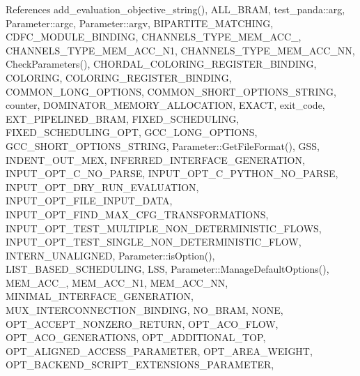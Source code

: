 References add\+\_\+evaluation\+\_\+objective\+\_\+string(), A\+L\+L\+\_\+\+B\+R\+AM, test\+\_\+panda\+::arg, Parameter\+::argc, Parameter\+::argv, B\+I\+P\+A\+R\+T\+I\+T\+E\+\_\+\+M\+A\+T\+C\+H\+I\+NG, C\+D\+F\+C\+\_\+\+M\+O\+D\+U\+L\+E\+\_\+\+B\+I\+N\+D\+I\+NG, C\+H\+A\+N\+N\+E\+L\+S\+\_\+\+T\+Y\+P\+E\+\_\+\+M\+E\+M\+\_\+\+A\+C\+C\+\_, C\+H\+A\+N\+N\+E\+L\+S\+\_\+\+T\+Y\+P\+E\+\_\+\+M\+E\+M\+\_\+\+A\+C\+C\+\_\+\+N1, C\+H\+A\+N\+N\+E\+L\+S\+\_\+\+T\+Y\+P\+E\+\_\+\+M\+E\+M\+\_\+\+A\+C\+C\+\_\+\+NN, Check\+Parameters(), C\+H\+O\+R\+D\+A\+L\+\_\+\+C\+O\+L\+O\+R\+I\+N\+G\+\_\+\+R\+E\+G\+I\+S\+T\+E\+R\+\_\+\+B\+I\+N\+D\+I\+NG, C\+O\+L\+O\+R\+I\+NG, C\+O\+L\+O\+R\+I\+N\+G\+\_\+\+R\+E\+G\+I\+S\+T\+E\+R\+\_\+\+B\+I\+N\+D\+I\+NG, C\+O\+M\+M\+O\+N\+\_\+\+L\+O\+N\+G\+\_\+\+O\+P\+T\+I\+O\+NS, C\+O\+M\+M\+O\+N\+\_\+\+S\+H\+O\+R\+T\+\_\+\+O\+P\+T\+I\+O\+N\+S\+\_\+\+S\+T\+R\+I\+NG, counter, D\+O\+M\+I\+N\+A\+T\+O\+R\+\_\+\+M\+E\+M\+O\+R\+Y\+\_\+\+A\+L\+L\+O\+C\+A\+T\+I\+ON, E\+X\+A\+CT, exit\+\_\+code, E\+X\+T\+\_\+\+P\+I\+P\+E\+L\+I\+N\+E\+D\+\_\+\+B\+R\+AM, F\+I\+X\+E\+D\+\_\+\+S\+C\+H\+E\+D\+U\+L\+I\+NG, F\+I\+X\+E\+D\+\_\+\+S\+C\+H\+E\+D\+U\+L\+I\+N\+G\+\_\+\+O\+PT, G\+C\+C\+\_\+\+L\+O\+N\+G\+\_\+\+O\+P\+T\+I\+O\+NS, G\+C\+C\+\_\+\+S\+H\+O\+R\+T\+\_\+\+O\+P\+T\+I\+O\+N\+S\+\_\+\+S\+T\+R\+I\+NG, Parameter\+::\+Get\+File\+Format(), G\+SS, I\+N\+D\+E\+N\+T\+\_\+\+O\+U\+T\+\_\+\+M\+EX, I\+N\+F\+E\+R\+R\+E\+D\+\_\+\+I\+N\+T\+E\+R\+F\+A\+C\+E\+\_\+\+G\+E\+N\+E\+R\+A\+T\+I\+ON, I\+N\+P\+U\+T\+\_\+\+O\+P\+T\+\_\+\+C\+\_\+\+N\+O\+\_\+\+P\+A\+R\+SE, I\+N\+P\+U\+T\+\_\+\+O\+P\+T\+\_\+\+C\+\_\+\+P\+Y\+T\+H\+O\+N\+\_\+\+N\+O\+\_\+\+P\+A\+R\+SE, I\+N\+P\+U\+T\+\_\+\+O\+P\+T\+\_\+\+D\+R\+Y\+\_\+\+R\+U\+N\+\_\+\+E\+V\+A\+L\+U\+A\+T\+I\+ON, I\+N\+P\+U\+T\+\_\+\+O\+P\+T\+\_\+\+F\+I\+L\+E\+\_\+\+I\+N\+P\+U\+T\+\_\+\+D\+A\+TA, I\+N\+P\+U\+T\+\_\+\+O\+P\+T\+\_\+\+F\+I\+N\+D\+\_\+\+M\+A\+X\+\_\+\+C\+F\+G\+\_\+\+T\+R\+A\+N\+S\+F\+O\+R\+M\+A\+T\+I\+O\+NS, I\+N\+P\+U\+T\+\_\+\+O\+P\+T\+\_\+\+T\+E\+S\+T\+\_\+\+M\+U\+L\+T\+I\+P\+L\+E\+\_\+\+N\+O\+N\+\_\+\+D\+E\+T\+E\+R\+M\+I\+N\+I\+S\+T\+I\+C\+\_\+\+F\+L\+O\+WS, I\+N\+P\+U\+T\+\_\+\+O\+P\+T\+\_\+\+T\+E\+S\+T\+\_\+\+S\+I\+N\+G\+L\+E\+\_\+\+N\+O\+N\+\_\+\+D\+E\+T\+E\+R\+M\+I\+N\+I\+S\+T\+I\+C\+\_\+\+F\+L\+OW, I\+N\+T\+E\+R\+N\+\_\+\+U\+N\+A\+L\+I\+G\+N\+ED, Parameter\+::is\+Option(), L\+I\+S\+T\+\_\+\+B\+A\+S\+E\+D\+\_\+\+S\+C\+H\+E\+D\+U\+L\+I\+NG, L\+SS, Parameter\+::\+Manage\+Default\+Options(), M\+E\+M\+\_\+\+A\+C\+C\+\_, M\+E\+M\+\_\+\+A\+C\+C\+\_\+\+N1, M\+E\+M\+\_\+\+A\+C\+C\+\_\+\+NN, M\+I\+N\+I\+M\+A\+L\+\_\+\+I\+N\+T\+E\+R\+F\+A\+C\+E\+\_\+\+G\+E\+N\+E\+R\+A\+T\+I\+ON, M\+U\+X\+\_\+\+I\+N\+T\+E\+R\+C\+O\+N\+N\+E\+C\+T\+I\+O\+N\+\_\+\+B\+I\+N\+D\+I\+NG, N\+O\+\_\+\+B\+R\+AM, N\+O\+NE, O\+P\+T\+\_\+\+A\+C\+C\+E\+P\+T\+\_\+\+N\+O\+N\+Z\+E\+R\+O\+\_\+\+R\+E\+T\+U\+RN, O\+P\+T\+\_\+\+A\+C\+O\+\_\+\+F\+L\+OW, O\+P\+T\+\_\+\+A\+C\+O\+\_\+\+G\+E\+N\+E\+R\+A\+T\+I\+O\+NS, O\+P\+T\+\_\+\+A\+D\+D\+I\+T\+I\+O\+N\+A\+L\+\_\+\+T\+OP, O\+P\+T\+\_\+\+A\+L\+I\+G\+N\+E\+D\+\_\+\+A\+C\+C\+E\+S\+S\+\_\+\+P\+A\+R\+A\+M\+E\+T\+ER, O\+P\+T\+\_\+\+A\+R\+E\+A\+\_\+\+W\+E\+I\+G\+HT, O\+P\+T\+\_\+\+B\+A\+C\+K\+E\+N\+D\+\_\+\+S\+C\+R\+I\+P\+T\+\_\+\+E\+X\+T\+E\+N\+S\+I\+O\+N\+S\+\_\+\+P\+A\+R\+A\+M\+E\+T\+ER, 
